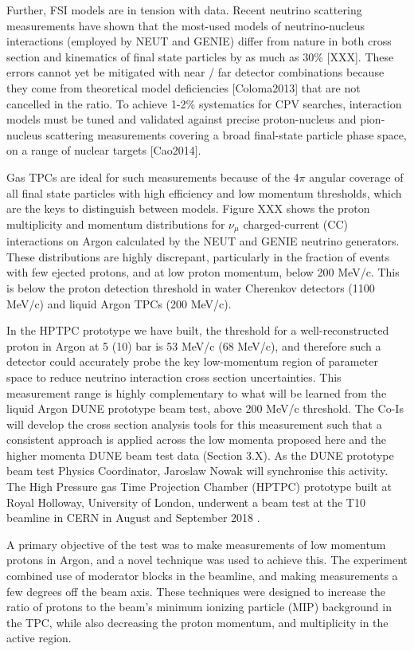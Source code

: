 Further, FSI models are in tension with data.  Recent neutrino scattering measurements have shown that the most-used models of neutrino-nucleus interactions (employed by NEUT and GENIE) differ from nature in both cross section and kinematics of final state particles by as much as 30\% [XXX]. These errors cannot yet be mitigated with near / far detector combinations because they come from theoretical model deficiencies [Coloma2013] that are not cancelled in the ratio. To achieve 1-2\% systematics for CPV searches, interaction models must be tuned and validated against precise proton-nucleus and pion-nucleus scattering measurements covering a broad final-state particle phase space, on a range of nuclear targets [Cao2014].

Gas TPCs are ideal for such measurements because of the 4$\pi$ angular coverage of all final state particles with high efficiency and low momentum thresholds, which are the keys to distinguish between models.  Figure XXX shows the proton multiplicity and momentum distributions for $\nu_{\mu}$ charged-current (CC) interactions on Argon calculated by the NEUT and GENIE neutrino generators.  These distributions are highly discrepant, particularly in the fraction of events with few ejected protons, and at low proton momentum, below 200 MeV/c. This is below the proton detection threshold in water Cherenkov detectors (1100 MeV/c) and liquid Argon TPCs (200 MeV/c). 

In the HPTPC prototype we have built, the threshold for a well-reconstructed proton in Argon at 5 (10) bar is 53 MeV/c (68 MeV/c), and therefore such a detector could accurately probe the key low-momentum region of parameter space to reduce neutrino interaction cross section uncertainties. This measurement range is highly complementary to what will be learned from the liquid Argon DUNE prototype beam test, above 200 MeV/c threshold. The Co-Is will develop the cross section analysis tools for this measurement such that a consistent approach is applied across the low momenta proposed here and the higher momenta DUNE beam test data (Section 3.X).  As the DUNE prototype beam test Physics Coordinator, Jaroslaw Nowak will synchronise this activity. 	The High Pressure gas Time Projection Chamber (HPTPC) prototype built at Royal Holloway, University of London, underwent a beam test at the T10 beamline in CERN in August and September 2018 \cite{SPSC-P-355}.

A primary objective of the test was to make measurements of low momentum protons in Argon, and a novel technique was used to achieve this.
The experiment combined use of moderator blocks in the beamline, and making measurements a few degrees off the beam axis.
These techniques were designed to increase the ratio of protons to the beam's minimum ionizing particle (MIP) background in the TPC, while also decreasing the proton momentum, and multiplicity in the active region.

